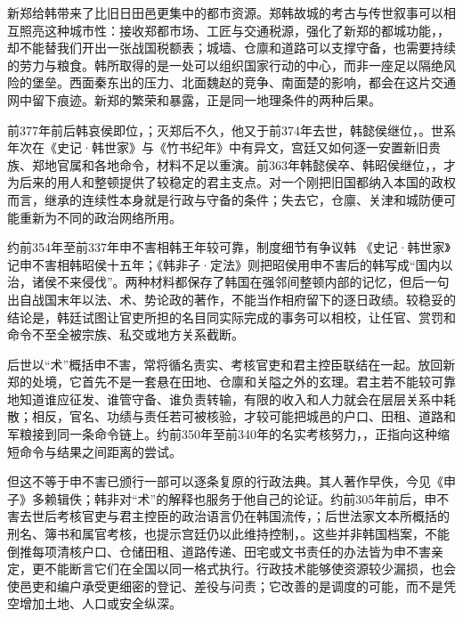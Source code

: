 新郑给韩带来了比旧日田邑更集中的都市资源。郑韩故城的考古与传世叙事可以相互照亮这种城市性：接收郑都市场、工匠与交通税源，强化了新郑的都城功能，，却不能替我们开出一张战国税额表；城墙、仓廪和道路可以支撑守备，也需要持续的劳力与粮食。韩所取得的是一处可以组织国家行动的中心，而非一座足以隔绝风险的堡垒。西面秦东出的压力、北面魏赵的竞争、南面楚的影响，都会在这片交通网中留下痕迹。新郑的繁荣和暴露，正是同一地理条件的两种后果。

前377年前后韩哀侯即位，；灭郑后不久，他又于前374年去世，韩懿侯继位，。世系年次在《史记·韩世家》与《竹书纪年》中有异文，宫廷又如何逐一安置新旧贵族、郑地官属和各地命令，材料不足以重演。前363年韩懿侯卒、韩昭侯继位，，才为后来的用人和整顿提供了较稳定的君主支点。对一个刚把旧国都纳入本国的政权而言，继承的连续性本身就是行政与守备的条件；失去它，仓廪、关津和城防便可能重新为不同的政治网络所用。

\begin{event}{约前354年至前337年}{申不害相韩}{王年较可靠，制度细节有争议}{韩}
《史记·韩世家》记申不害相韩昭侯十五年；《韩非子·定法》则把昭侯用申不害后的韩写成“国内以治，诸侯不来侵伐”。两种材料都保存了韩国在强邻间整顿内部的记忆，但后一句出自战国末年以法、术、势论政的著作，不能当作相府留下的逐日政绩。较稳妥的结论是，韩廷试图让官吏所担的名目同实际完成的事务可以相校，让任官、赏罚和命令不至全被宗族、私交或地方关系截断。
\end{event}

后世以“术”概括申不害，常将循名责实、考核官吏和君主控臣联结在一起。放回新郑的处境，它首先不是一套悬在田地、仓廪和关隘之外的玄理。君主若不能较可靠地知道谁应征发、谁管守备、谁负责转输，有限的收入和人力就会在层层关系中耗散；相反，官名、功绩与责任若可被核验，才较可能把城邑的户口、田租、道路和军粮接到同一条命令链上。约前350年至前340年的名实考核努力，，正指向这种缩短命令与结果之间距离的尝试。

但这不等于申不害已颁行一部可以逐条复原的行政法典。其人著作早佚，今见《申子》多赖辑佚；韩非对“术”的解释也服务于他自己的论证。约前305年前后，申不害去世后考核官吏与君主控臣的政治语言仍在韩国流传，；后世法家文本所概括的刑名、簿书和属官考核，也提示宫廷仍以此维持控制，。这些并非韩国档案，不能倒推每项清核户口、仓储田租、道路传递、田宅或文书责任的办法皆为申不害亲定，更不能断言它们在全国以同一格式执行。行政技术能够使资源较少漏损，也会使邑吏和编户承受更细密的登记、差役与问责；它改善的是调度的可能，而不是凭空增加土地、人口或安全纵深。

